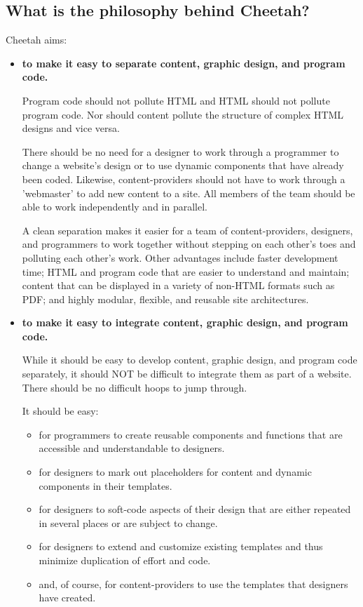 \subsection{What is the philosophy behind Cheetah?}
\label{intro.aims}
Cheetah aims:
\begin{itemize}
\item {\bf to make it easy to separate content, graphic design, and program code.}
     
     Program code should not pollute HTML and HTML should not pollute program
     code. Nor should content pollute the structure of complex HTML designs and
     vice versa.

     There should be no need for a designer to work through a programmer to
     change a website's design or to use dynamic components that have already
     been coded.  Likewise, content-providers should not have to work through a
     'webmaster' to add new content to a site.  All members of the team should
     be able to work independently and in parallel.
     
     A clean separation makes it easier for a team of content-providers,
     designers, and programmers to work together without stepping on each
     other's toes and polluting each other's work. Other advantages include
     faster development time; HTML and program code that are easier to
     understand and maintain; content that can be displayed in a variety of
     non-HTML formats such as PDF; and highly modular, flexible, and reusable
     site architectures.       
     
\item {\bf to make it easy to integrate content, graphic design, and program code.}
     
     While it should be easy to develop content, graphic design, and program
     code separately, it should NOT be difficult to integrate them as part of a
     website.  There should be no difficult hoops to jump through.
     
     It should be easy:
     \begin{itemize}
     \item for programmers to create reusable components and functions that are
          accessible and understandable to designers.
     \item for designers to mark out placeholders for content and dynamic components
          in their templates.
     \item for designers to soft-code aspects of their design that are either
          repeated in several places or are subject to change.
     \item for designers to extend and customize existing templates and thus minimize
          duplication of effort and code.
     \item and, of course, for content-providers to use the templates that
          designers have created.
     \end{itemize}


\end{itemize}
